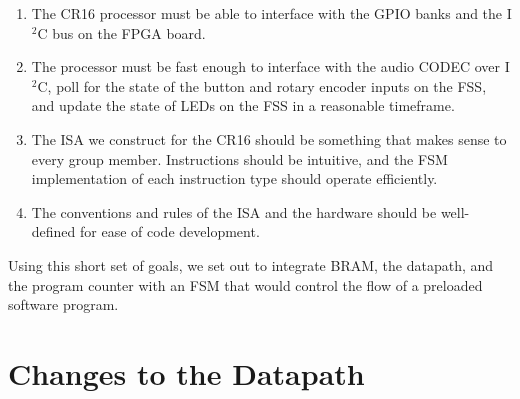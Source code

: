 \documentclass[conference]{IEEEtran}
\begin{document}
\begin{enumerate}
    \item The CR16 processor must be able to interface with the GPIO banks and the I$^2$C bus on the FPGA board.
    \item The processor must be fast enough to interface with the audio CODEC over I$^2$C, poll for the state of the button and rotary encoder inputs on the FSS, and update the state of LEDs on the FSS in a reasonable timeframe.
    \item The ISA we construct for the CR16 should be something that makes sense to every group member. Instructions should be intuitive, and the FSM implementation of each instruction type should operate efficiently.
    \item The conventions and rules of the ISA and the hardware should be well-defined for ease of code development.
\end{enumerate}

Using this short set of goals, we set out to integrate BRAM, the datapath, and the program counter with an FSM that would control the flow of a preloaded software program.

\section{Changes to the Datapath}
\end{document}
